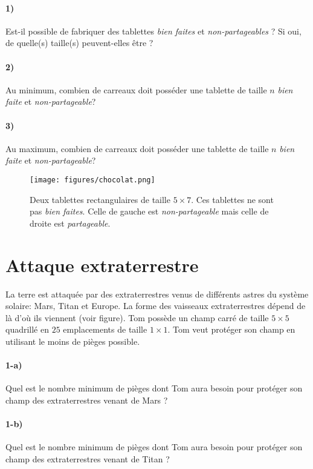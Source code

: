 \documentclass[a4paper,10pt,oneside]{article}
\begin{document}
\paragraph*{1)} 
Est-il possible de fabriquer des tablettes \textit{bien faites} et \textit{non-partageables} ?
Si oui, de quelle(s) taille(s) peuvent-elles être ? 

\paragraph*{2)} 
Au minimum, combien de carreaux doit posséder une tablette de taille $n$ \textit{bien faite} et \textit{non-partageable}?

\paragraph*{3)} 
Au maximum, combien de carreaux doit posséder une tablette de taille $n$ \textit{bien faite} et \textit{non-partageable}?

\vspace{3cm}
\begin{figure}[!ht]
  \centering
  \texttt{[image: figures/chocolat.png]}
  \caption*{Deux tablettes rectangulaires de taille $5\times 7$. 
  Ces tablettes ne sont pas \textit{bien faites}.
  Celle de gauche est \textit{non-partageable} mais celle de droite est \textit{partageable}.}
\end{figure}


\clearpage
\section{Attaque extraterrestre}

La terre est attaquée par des extraterrestres venus de différents astres du système solaire: Mars, Titan et Europe.
La forme des vaisseaux extraterrestres dépend de là d'où ils viennent (voir figure).
Tom possède un champ carré de taille $5\times 5$ quadrillé en $25$ emplacements de taille $1\times 1$.
Tom veut protéger son champ en utilisant le moins de pièges possible.

\paragraph*{1-a)}
Quel est le nombre minimum de pièges dont Tom aura besoin pour protéger son champ des extraterrestres venant de Mars ?

\paragraph*{1-b)}
Quel est le nombre minimum de pièges dont Tom aura besoin pour protéger son champ des extraterrestres venant de Titan ?
\end{document}

